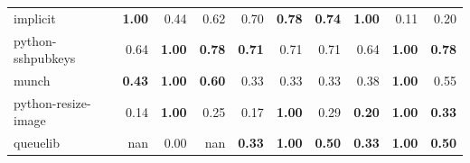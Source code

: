 \documentclass[11pt,dvipdfmx]{jreport}
\begin{document}
\begin{table}{}
{\begin{tabular}{l||p{4em}|p{4em}|p{4em}||p{4em}|p{4em}|p{4em}||p{4em}|p{4em}|p{4em}}
            \hline \hline
            implicit & \multicolumn{1}{r|}{\textbf{1.00}} & \multicolumn{1}{r|}{0.44} & \multicolumn{1}{r||}{0.62} & \multicolumn{1}{r|}{0.70} & \multicolumn{1}{r|}{\textbf{0.78}} & \multicolumn{1}{r||}{\textbf{0.74}} & \multicolumn{1}{r|}{\textbf{1.00}} & \multicolumn{1}{r|}{0.11} & \multicolumn{1}{r}{0.20} \\
            python-sshpubkeys & \multicolumn{1}{r|}{0.64} & \multicolumn{1}{r|}{\textbf{1.00}} & \multicolumn{1}{r||}{\textbf{0.78}} & \multicolumn{1}{r|}{\textbf{0.71}} & \multicolumn{1}{r|}{0.71} & \multicolumn{1}{r||}{0.71} & \multicolumn{1}{r|}{0.64} & \multicolumn{1}{r|}{\textbf{1.00}} & \multicolumn{1}{r}{\textbf{0.78}} \\
            munch & \multicolumn{1}{r|}{\textbf{0.43}} & \multicolumn{1}{r|}{\textbf{1.00}} & \multicolumn{1}{r||}{\textbf{0.60}} & \multicolumn{1}{r|}{0.33} & \multicolumn{1}{r|}{0.33} & \multicolumn{1}{r||}{0.33} & \multicolumn{1}{r|}{0.38} & \multicolumn{1}{r|}{\textbf{1.00}} & \multicolumn{1}{r}{0.55} \\
            python-resize-image & \multicolumn{1}{r|}{0.14} & \multicolumn{1}{r|}{\textbf{1.00}} & \multicolumn{1}{r||}{0.25} & \multicolumn{1}{r|}{0.17} & \multicolumn{1}{r|}{\textbf{1.00}} & \multicolumn{1}{r||}{0.29} & \multicolumn{1}{r|}{\textbf{0.20}} & \multicolumn{1}{r|}{\textbf{1.00}} & \multicolumn{1}{r}{\textbf{0.33}} \\
            queuelib & \multicolumn{1}{r|}{nan} & \multicolumn{1}{r|}{0.00} & \multicolumn{1}{r||}{nan} & \multicolumn{1}{r|}{\textbf{0.33}} & \multicolumn{1}{r|}{\textbf{1.00}} & \multicolumn{1}{r||}{\textbf{0.50}} & \multicolumn{1}{r|}{\textbf{0.33}} & \multicolumn{1}{r|}{\textbf{1.00}} & \multicolumn{1}{r}{\textbf{0.50}} \\ \hline
        \end{tabular}
    }
\end{table}
\end{document}

